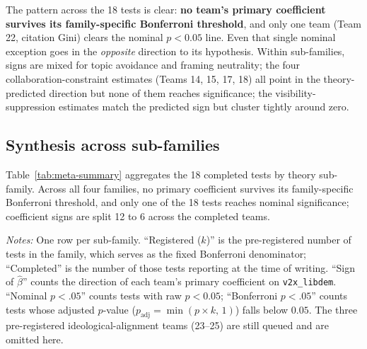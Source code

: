 \documentclass[12pt,a4paper]{article}
\begin{document}
The pattern across the 18 tests is clear: \textbf{no team's primary
coefficient survives its family-specific Bonferroni threshold}, and only
one team (Team 22, citation Gini) clears the nominal $p<0.05$ line. Even
that single nominal exception goes in the \emph{opposite} direction to
its hypothesis. Within sub-families, signs are mixed for topic avoidance
and framing neutrality; the four collaboration-constraint estimates
(Teams 14, 15, 17, 18) all point in the theory-predicted direction but
none of them reaches significance; the visibility-suppression estimates
match the predicted sign but cluster tightly around zero.

\subsection{Synthesis across sub-families}

Table~\ref{tab:meta-summary} aggregates the 18 completed tests by theory
sub-family. Across all four families, no primary coefficient survives its
family-specific Bonferroni threshold, and only one of the 18 tests reaches
nominal significance; coefficient signs are split 12 to 6 across the completed
teams.

\begin{table}[ht]
\centering
\caption{Synthesis of the 18 completed team tests, by theory sub-family.}
\label{tab:meta-summary}


\vspace{0.4em}
{\footnotesize\begin{minipage}{0.92\textwidth}
\emph{Notes:} One row per sub-family. ``Registered ($k$)'' is the
pre-registered number of tests in the family, which serves as the fixed
Bonferroni denominator; ``Completed'' is the number of those tests reporting at
the time of writing. ``Sign of $\hat{\beta}$'' counts the direction of each
team's primary coefficient on \texttt{v2x\_libdem}. ``Nominal $p<.05$'' counts
tests with raw $p<0.05$; ``Bonferroni $p<.05$'' counts tests whose adjusted
$p$-value ($p_{\text{adj}} = \min(p \times k,\,1)$) falls below $0.05$. The
three pre-registered ideological-alignment teams (23--25) are still queued and
are omitted here.
\end{minipage}}
\end{table}


\end{document}
